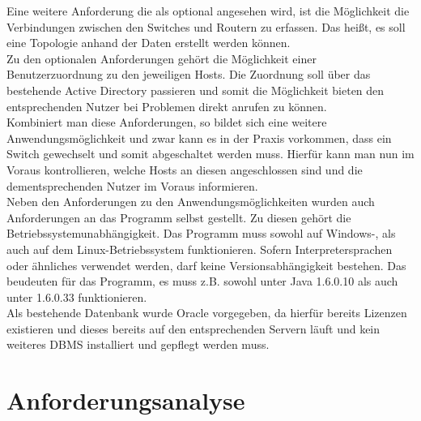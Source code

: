 Eine weitere Anforderung die als optional angesehen wird, ist die Möglichkeit die Verbindungen zwischen den Switches und Routern zu erfassen. Das heißt, es soll eine Topologie anhand der Daten erstellt werden können.\\
Zu den optionalen Anforderungen gehört die Möglichkeit einer Benutzerzuordnung zu den jeweiligen Hosts. Die Zuordnung soll über das bestehende Active Directory passieren und somit die Möglichkeit bieten den entsprechenden Nutzer bei Problemen direkt anrufen zu können.\\
Kombiniert man diese Anforderungen, so bildet sich eine weitere Anwendungsmöglichkeit und zwar kann es in der Praxis vorkommen, dass ein Switch gewechselt und somit abgeschaltet werden muss.
Hierfür kann man nun im Voraus kontrollieren, welche Hosts an diesen angeschlossen sind und die dementsprechenden Nutzer im Voraus informieren.\\

Neben den Anforderungen zu den Anwendungsmöglichkeiten wurden auch Anforderungen an das Programm selbst gestellt.
Zu diesen gehört die Betriebssystemunabhängigkeit.
Das Programm muss sowohl auf Windows-, als auch auf dem Linux-Betriebssystem funktionieren. Sofern Interpretersprachen oder ähnliches verwendet werden, darf keine Versionsabhängigkeit bestehen. Das beudeuten für das Programm, es muss z.B. sowohl unter Java 1.6.0.10 als auch unter 1.6.0.33 funktionieren.\\
Als bestehende Datenbank wurde Oracle vorgegeben, da hierfür bereits Lizenzen existieren und dieses bereits auf den entsprechenden Servern läuft und kein weiteres DBMS installiert und gepflegt werden muss.\\

\section{Anforderungsanalyse}
\label{sec:anfanalyse}

